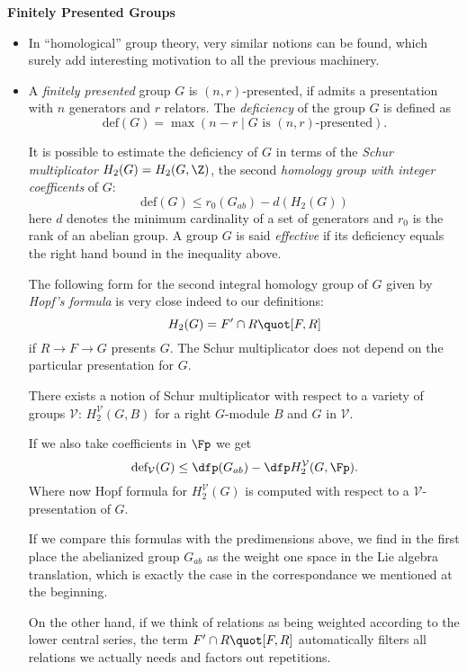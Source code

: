 \documentclass[a4paper,11pt,german,english]{report}
\begin{document}
\indent
{\bf Finitely Presented Groups}
\begin{itemize}
\item[]In ``homological'' group theory, very similar notions can be found, which surely add interesting motivation to
all the previous machinery.


\item[]A {\em finitely presented} group $G$ is $(n,r)$-presented, if admits a presentation
with $n$ generators and $r$ relators. The {\em deficiency} of the group $G$ is defined as
$$\mathrm{def}(G)=\max(n-r\mid G\,\,\text{is $(n, r)$-presented}).$$

It is possible to estimate the deficiency of $G$ in terms of the {\em Schur multiplicator}
$H_{2}(G)=H_{2}(G,\Z)$, the second {\em homology group with integer coefficents} of $G$:
$$\text{def}(G)\leq r_{0}(G_{ab})-d(H_{2}(G))$$
here $d$ denotes the minimum cardinality of a set of generators and $r_{0}$ is the rank of an abelian group.
A group $G$ is said {\em effective} if its deficiency equals the right hand bound in the inequality above.

The following form for the second integral homology group of $G$ given by {\em Hopf's
formula} is very close indeed to our definitions:
$$H_{2}(G)=F^{\prime}\cap R\quot [F,R]$$
if $R\to F\to G$ presents $G$. The Schur multiplicator does not depend on the particular
presentation for $G$.

There exists a notion of Schur multiplicator with respect to a variety of groups $\mathcal{V}$:
$H^{\mathcal{V}}_{2}(G,B)$ for a right $G$-module $B$ and $G$ in $\mathcal{V}$.

If we also take coefficients in $\Fp$ we get
$$\mathrm{def_{\mathcal{V}}}(G)\leq\dfp(G_{ab})-\dfp H_{2}^{\mathcal{V}}(G,\Fp).$$
Where now Hopf formula for $H_{2}^{\mathcal{V}}(G)$ is computed with respect
to a $\mathcal{V}$-presentation of $G$.

If we compare this formulas with the predimensions above, we find in the first
place the abelianized group $G_{ab}$ as the weight one space in the
Lie algebra translation, which is exactly the case in the correspondance we mentioned at the beginning.

On the other hand, if we think of relations as being weighted according to the lower central series, the term $F^{\prime}\cap R\quot [F,R]$ automatically filters
all relations we actually needs and factors out repetitions.


\end{itemize}
\end{document}
